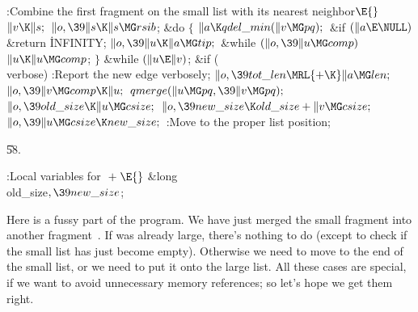 \B{}:Combine the first fragment on the small list with its nearest
neighbor\X${}\E{}$\6
$\|v\K\|s;{}$\6
${}\|o,\39\|s\K\|s\MG\\{rsib}{}$;\6
\&{do}\5
${}\{{}$\1\6
${}\|a\K\\{qdel\_min}(\|v\MG\\{pq});{}$\6
\&{if} ${}(\|a\E\NULL){}$\1\5
\&{return} \.{INFINITY};\2\6
${}\|o,\39\|u\K\|a\MG\\{tip};{}$\6
\&{while} ${}(\|o,\39\|u\MG\\{comp}){}$\1\5
${}\|u\K\|u\MG\\{comp}{}$;\2\6
\4${}\}{}$\5
\2\5
\&{while} ${}(\|u\E\|v){}$;\6
\&{if} (\\{verbose})\1\5
:Report the new edge verbosely\X;\2\6
${}\|o,\39\\{tot\_len}\MRL{+{\K}}\|a\MG\\{len};{}$\6
${}\|o,\39\|v\MG\\{comp}\K\|u;{}$\6
${}\\{qmerge}(\|u\MG\\{pq},\39\|v\MG\\{pq});{}$\6
${}\|o,\39\\{old\_size}\K\|u\MG\\{csize};{}$\6
${}\|o,\39\\{new\_size}\K\\{old\_size}+\|v\MG\\{csize};{}$\6
${}\|o,\39\|u\MG\\{csize}\K\\{new\_size};{}$\6
:Move  to the proper list position\X;\par
\U58.\fi

\B{}:Local variables for \X${}\mathrel+\E{}$\6
\&{long} \\{old\_size}${},\39\\{new\_size}{}$;\par
\fi

Here is a fussy part of the program. We have just merged the small
fragment  into another fragment~. If  was already
large,
there's nothing to do (except to check if the small list has just
become empty). Otherwise we need to move  to the end of the small
list, or we need to put it onto the large list.
All these cases are special, if we
want to avoid unnecessary memory references; so let's hope we get them right.

